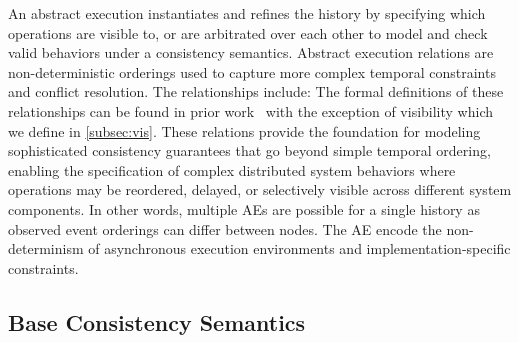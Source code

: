 An abstract execution instantiates and refines the history by
specifying which operations are visible to, or are arbitrated over
each other to model and check valid behaviors under a consistency semantics.
Abstract execution relations are non-deterministic
orderings used to capture more complex temporal constraints and
conflict resolution. The relationships include:
The formal definitions of these relationships can be found in prior
work~\cite{burckhardt2014principles,viotti2016consistency}
with the exception of visibility which we define in \cref{subsec:vis}.
These relations provide the foundation
for modeling sophisticated consistency guarantees that go beyond
simple temporal ordering, enabling the specification of complex
distributed system behaviors where operations may be reordered,
delayed, or selectively visible across different system components.
In other words, multiple AEs are possible for a
single history as observed event orderings can differ between nodes.
The AE encode the non-determinism of asynchronous execution
environments and implementation-specific constraints.

\subsection{Base Consistency Semantics}
\label{subsec:semdef}

